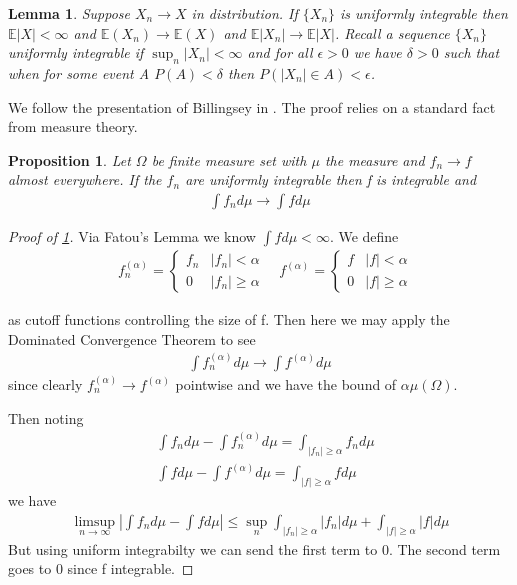 \documentclass[10pt]{article}
\newcommand{\E}{\mathbb{E}}
\newcommand{\1}{\textbf{1}}
\newtheorem{prop}{Proposition}[subsection]
\newtheorem{lemma}{Lemma}[subsection]
\theoremstyle{remark}
\theoremstyle{definition}
\begin{document}
\begin{lemma}\label{lem:A1}
	Suppose $X_n \to X$ in distribution. If $\{X_n\}$ is uniformly integrable then $\E|X| < \infty$ and $\E(X_n) \to \E(X)$ and $\E |X_n| \to \E |X|$. Recall a sequence $\{X_n\}$ uniformly integrable if $\sup_n |X_n| < \infty$ and for all $\epsilon > 0$ we have $\delta > 0$ such that when for some event A $P(A) < \delta$ then $P(|X_n| \in A) < \epsilon$. 
\end{lemma}

We follow the presentation of Billingsey in \cite{BB}. The proof relies on a standard fact from measure theory.

\begin{prop}\label{prop:A1}
	Let $\Omega$ be finite measure set with $\mu$ the measure and $f_n \to f$ almost everywhere. If the $f_n$ are uniformly integrable then f is integrable and
	\begin{align*}
		\int f_n d\mu \to \int f d\mu
	\end{align*}
\end{prop}

\begin{proof}[Proof of \ref{prop:A1}]
	Via Fatou's Lemma we know $\int f d\mu < \infty$. We define
	\begin{align*}
		&f_n^{{(\alpha)}} = 
		\begin{cases}
			f_n & |f_n| < \alpha \\
			0 & |f_n| \geq \alpha 
		\end{cases}\quad
		f^{(\alpha)} = 
		\begin{cases}
			f & |f| < \alpha\\
			0 & |f| \geq \alpha
		\end{cases}
	\end{align*}

	as cutoff functions controlling the size of f. Then here we may apply the Dominated Convergence Theorem to see
	\begin{align*}
		\int f_n^{(\alpha)} d\mu \to \int f^{(\alpha)} d\mu
	\end{align*}
	since clearly $f_n^{(\alpha)} \to f^{(\alpha)}$ pointwise and we have the bound of $\alpha \mu(\Omega)$. 

	Then noting
	\begin{align*}
		&\int f_n d\mu - \int f_n^{(\alpha)} d\mu = \int_{|f_n| \geq \alpha} f_n d\mu \\
		& \int f d\mu - \int f^{(\alpha)} d\mu = \int_{|f| \geq \alpha} fd\mu
	\end{align*} 
	we have
	\begin{align*}
		\limsup_{n \to \infty}|\int f_n d\mu - \int f d\mu| \leq \sup_n \int_{|f_n|\geq \alpha} |f_n| d\mu + \int_{|f| \geq \alpha} |f| d\mu
	\end{align*}
	But using uniform integrabilty we can send the first term to 0. The second term goes to 0 since f integrable. 
\end{proof}
\end{document}
